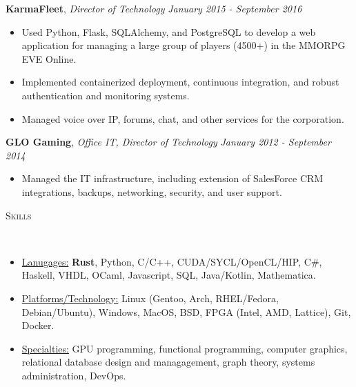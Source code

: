 \documentclass[8pt]{article}
\newenvironment{changemargin}[2]{%
  \begin{list}{}{%
    \setlength{\topsep}{0pt}%
    \setlength{\leftmargin}{#1}%
    \setlength{\rightmargin}{#2}%
    \setlength{\listparindent}{\parindent}%
    \setlength{\itemindent}{\parindent}%
    \setlength{\parsep}{\parskip}%
  }%
  \item[]}{\end{list}
}
\newcommand{\lineover}{
	\begin{changemargin}{-0.05in}{-0.05in}
		\vspace*{-8pt}
		\hrulefill \\
		\vspace*{-2pt}
	\end{changemargin}
}
\newcommand{\header}[1]{
	\begin{changemargin}{-0.5in}{-0.5in}
		\scshape{#1}\\
  	\lineover
	\end{changemargin}
}
\newenvironment{body} {
	\vspace*{-16pt}
	\begin{changemargin}{-0.25in}{-0.5in}
  }	
	{\end{changemargin}
}
\begin{document}
\begin{body}
	\textbf{KarmaFleet}, \emph{Director of Technology} \hfill \emph{January 2015 - September 2016}\\
	\vspace*{-4pt}
	\begin{itemize} \itemsep -0pt %
		\item Used Python, Flask, SQLAlchemy, and PostgreSQL to develop a web application for managing a large group of players (4500+) in the MMORPG EVE Online.
		\item Implemented containerized deployment, continuous integration, and robust authentication and monitoring systems.
		\item Managed voice over IP, forums, chat, and other services for the corporation. 
	\end{itemize}
	\vspace*{-4pt}

	\textbf{GLO Gaming}, \emph{Office IT, Director of Technology} \hfill \emph{January 2012 - September 2014}\\
	\vspace*{-4pt}
	\begin{itemize} \itemsep -0pt %
		\item Managed the IT infrastructure, including extension of SalesForce CRM integrations, backups, networking, security, and user support. 
	\end{itemize}
	\vspace*{-4pt}

	\smallskip
	\vspace*{-9pt}
	\smallskip
\end{body}


\smallskip

\header{Skills}
\smallskip
\begin{body}
	\vspace{14pt}
	\begin{itemize} \itemsep -0pt

		\item \uline{Lanugages:} \textbf{Rust}, Python, C/C++, CUDA/SYCL/OpenCL/HIP, C\#, Haskell, VHDL, OCaml, Javascript, SQL, Java/Kotlin, Mathematica.

		\item \uline{Platforms/Technology:} Linux (Gentoo, Arch, RHEL/Fedora,
		Debian/Ubuntu), Windows, MacOS,
		      BSD, FPGA (Intel, AMD, Lattice), Git, Docker.
		\item \uline{Specialties:} GPU programming, functional programming, computer graphics, relational database design and managagement, graph theory, systems administration, DevOps.
	\end{itemize}
\end{body}
\end{document}
